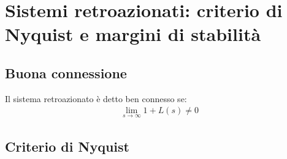 \section{Sistemi retroazionati: criterio di Nyquist e margini di stabilità}

\subsection{Buona connessione}

\begin{definition}
  Il sistema retroazionato è detto ben connesso se:
  \begin{align}
    \lim_{s\to\infty} 1 + L(s) \neq 0
  \end{align}
\end{definition}


\subsection{Criterio di Nyquist}


